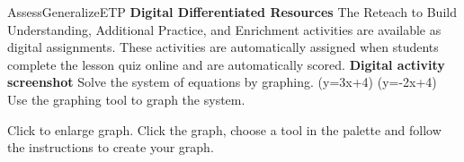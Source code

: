 \documentclass{article}
\newenvironment{te-addendum}[2]{}{}     %
\newcommand{\placeholder}[2]{}          %
\newcommand{\te}[1]{}                   %
\begin{document}
\begin{te-addendum}{Assess}{GeneralizeETP}
\textbf{Digital Differentiated Resources}
The Reteach to Build Understanding, Additional Practice, and Enrichment activities are available as digital assignments. These activities are automatically assigned when students complete the lesson quiz online and are automatically scored.
\textbf{Digital activity screenshot}
Solve the system of equations by graphing.
(y=3x+4)
(y=-2x+4)
Use the graphing tool to graph the system.
\placeholder{graph}{Digital exercise blank Cartesian grid, arrowed x/y axes, origin O, unit grid, even-number labels -10 through 10 on both axes. Window [-10,10] by [-10,10]; no plotted points or lines; Question Help menu overlays upper-right quadrant.}
Click to enlarge graph.
Click the graph, choose a tool in the palette and follow the instructions to create your graph.
\te{Interface labels: Exit; Question Help; Help Me Solve This; View an Example; Video; Textbook; Glossary; Math Tools; Print; 1 part remaining; Clear All; Check Answer; Review progress; Question 5 of 14; Go; Back; Next. Resource previews carry SavvasRealize.com, enVision Algebra 2 • Teaching Resources, and a copyright notice.}
\end{te-addendum}
\end{document}
